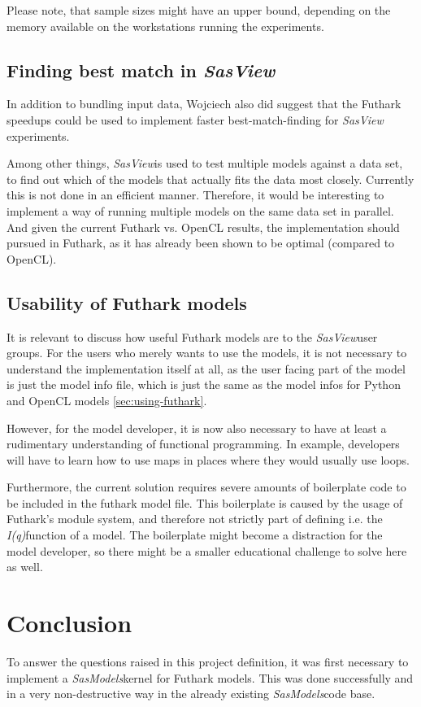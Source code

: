 \documentclass[11pt]{article}
\newcommand{\sasmodels}{\textit{SasModels}}
\newcommand{\sasview}{\textit{SasView}}
\newcommand{\iq}{\textit{I(q)}}
\begin{document}
Please note, that sample sizes might have an upper bound, depending on the
memory available on the workstations running the experiments.

\subsection{Finding best match in \sasview}
\label{sec:best-match}
In addition to bundling input data, Wojciech also did suggest that the Futhark
speedups could be used to implement faster best-match-finding for \sasview
experiments.

Among other things, \sasview is used to test multiple models against a data set,
to find out which of the models that actually fits the data most closely.
Currently this is not done in an efficient manner.
Therefore, it would be interesting to implement a way of running multiple models
on the same data set in parallel.
And given the current Futhark vs. OpenCL results, the implementation should
pursued in Futhark, as it has already been shown to be optimal
(compared to OpenCL).


\subsection{Usability of Futhark models}
It is relevant to discuss how useful Futhark models are to the \sasview user
groups. For the users who merely wants to use the models, it is not necessary
to understand the implementation itself at all, as the user facing part of
the model is just the model info file, which is just the same as the model infos
for Python and OpenCL models \ref{sec:using-futhark}.

However, for the model developer, it is now also necessary to have at least a
rudimentary understanding of functional programming.
In example, developers will have to learn how to use maps in
places where they would usually use loops.

Furthermore, the current solution requires severe amounts of boilerplate code to
be included in the futhark model file.
This boilerplate is caused by the usage of Futhark's module system, and
therefore not strictly part of defining i.e. the \iq function of a model.
The boilerplate might become a distraction for the model developer, so
there might be a smaller educational challenge to solve here as well.

\section{Conclusion}
To answer the questions raised in this project definition, it was first
necessary to implement a \sasmodels kernel for Futhark models. This was done
successfully and in a very non-destructive way in the already existing
\sasmodels code base.
\end{document}
